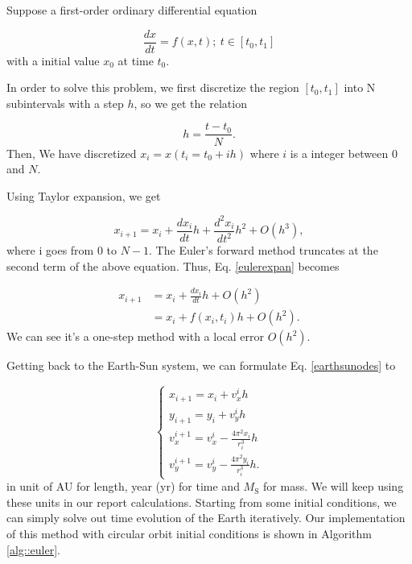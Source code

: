 Suppose a first-order ordinary differential equation

\begin{equation}
	\frac{dx}{dt} = f(x,t);\ t\in[t_0,t_1]
\end{equation}
with a initial value $x_0$ at time $t_0$. 

In order to solve this problem, we first discretize the region $ [t_0,t_1]$ into N subintervals with a step $h$, so we get the relation

\begin{equation}
	h=\frac{t-t_0}{N}.
\end{equation}
Then, We have discretized $x_i=x(t_i=t_0+ih)$ where $i$ is a integer between 0 and $N$.

Using Taylor expansion, we get 

\begin{equation}
	\label{eulerexpan}
	x_{i+1} = x_i + \frac{dx_i}{dt}h + \frac{d^2x_i}{dt^2}h^2 + O(h^3),
\end{equation}
where i goes from 0 to $N-1$.
The Euler's forward method truncates at the second term of the above equation.
Thus, Eq. \ref{eulerexpan} becomes

\begin{equation}
	\begin{aligned}
		x_{i+1} & = x_i + \frac{dx_i}{dt}h + O(h^2) \\ 
				& = x_i + f(x_i,t_i)h + O(h^2).
	\end{aligned}
\end{equation}
We can see it's a one-step method with a local error $O(h^2)$.

Getting back to the Earth-Sun system, we can formulate Eq. \ref{earthsunodes} to

\begin{equation}
	\left\{  
             \begin{array}{lr}  
             	x_{i+1} = x_i + v_x^{i}h \\
				y_{i+1} = y_i + v_y^{i}h \\
             	v_x^{i+1} = v_x^{i} - \frac{4\pi^2x_i}{r_i^3}h\\
             	v_y^{i+1} = v_y^{i} - \frac{4\pi^2y_i}{r_i^3}h.
			\end{array}  
	\right.	
\end{equation} 
in unit of AU for length, year (yr) for time and $M_{\mathrm{S}}$ for mass. 
We will keep using these units in our report calculations. 
Starting from some initial conditions, we can simply solve out time evolution of the Earth iteratively. 
Our implementation of this method with circular orbit initial conditions is shown in Algorithm \ref{alg::euler}. 

